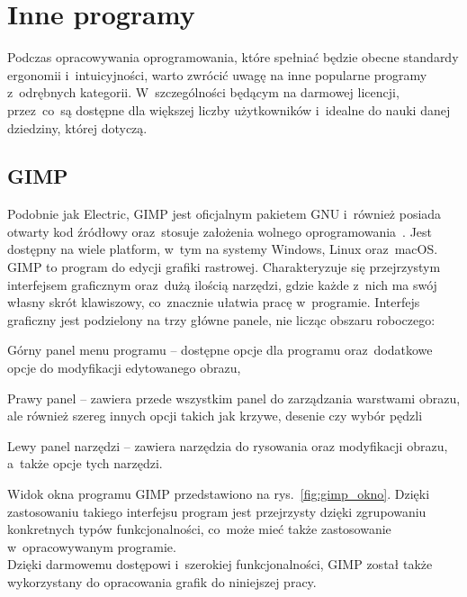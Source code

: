 \section{Inne programy}
\label{sec:inne_programy}

Podczas opracowywania oprogramowania,
które spełniać będzie obecne standardy ergonomii i~intuicyjności,
warto zwrócić uwagę na inne popularne programy z~odrębnych kategorii.
W~szczególności będącym na darmowej licencji,
przez~co~są dostępne dla większej liczby użytkowników
i~idealne do nauki danej dziedziny, której dotyczą.

\subsection{GIMP}
\label{subsec:gimp}

Podobnie jak Electric, GIMP jest oficjalnym pakietem GNU i~również posiada otwarty kod źródłowy
oraz~stosuje założenia wolnego oprogramowania~\cite{gimp_site}.
Jest dostępny na wiele platform, w~tym na systemy Windows, Linux oraz~macOS.
GIMP to program do edycji grafiki rastrowej.
Charakteryzuje się przejrzystym interfejsem graficznym oraz~dużą ilością narzędzi,
gdzie każde z~nich ma swój własny skrót klawiszowy, co~znacznie ułatwia pracę w~programie.
\indent Interfejs graficzny jest podzielony na trzy główne panele, nie licząc obszaru roboczego:

\begin{citemize}
    \item Górny panel menu programu -- dostępne opcje dla programu oraz~dodatkowe opcje do modyfikacji edytowanego obrazu,
    \item Prawy panel -- zawiera przede wszystkim panel do zarządzania warstwami obrazu,
    ale również szereg innych opcji takich jak krzywe, desenie czy wybór pędzli
    \item Lewy panel narzędzi -- zawiera narzędzia do rysowania oraz modyfikacji obrazu,
    a~także opcje tych narzędzi.
\end{citemize}

Widok okna programu GIMP przedstawiono na rys.~\ref{fig:gimp_okno}.
Dzięki zastosowaniu takiego interfejsu program jest przejrzysty dzięki zgrupowaniu konkretnych typów funkcjonalności,
co~może mieć także zastosowanie w~opracowywanym programie. \\
\indent Dzięki darmowemu dostępowi i~szerokiej funkcjonalności,
GIMP został także wykorzystany do opracowania grafik do niniejszej pracy.

